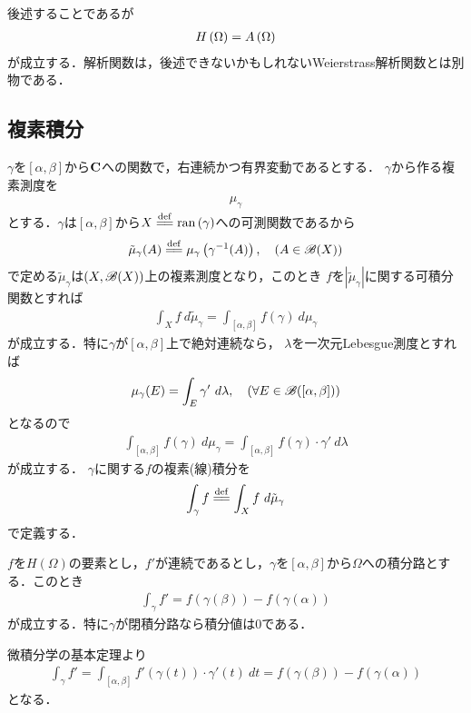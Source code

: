 	後述することであるが
	\begin{align}
		H\left(\Omega\right) = A\left(\Omega\right)
	\end{align}
	が成立する．解析関数は，後述できないかもしれないWeierstrass解析関数とは別物である．
	
\subsection{複素積分}
	$\gamma$を$[\alpha,\beta]$から$\mathbf{C}$への関数で，右連続かつ有界変動であるとする．
	$\gamma$から作る複素測度を
	\begin{align}
		\mu_\gamma
	\end{align}
	とする．$\gamma$は$[\alpha,\beta]$から$X \defeq \ran{\gamma}$への可測関数であるから
	\begin{align}
		\tilde{\mu}_\gamma(A) \defeq \mu_\gamma\left( \gamma^{-1}(A) \right),
		\quad (A \in \borel{X})
	\end{align}
	で定める$\tilde{\mu}_\gamma$は$(X,\mathscr{B}(X))$上の複素測度となり，このとき
	$f$を$|\tilde{\mu}_\gamma|$に関する可積分関数とすれば
	\begin{align}
		\int_X f\ d\tilde{\mu}_\gamma = \int_{[\alpha,\beta]} f(\gamma)\ d\mu_\gamma
	\end{align}
	が成立する．特に$\gamma$が$[\alpha,\beta]$上で絶対連続なら，
	$\lambda$を一次元Lebesgue測度とすれば
	\begin{align}
		\mu_\gamma(E) = \int_E \gamma'\ d\lambda,
		\quad (\forall E \in \mathscr{B}([\alpha,\beta]))
	\end{align}
	となるので
	\begin{align}
		\int_{[\alpha,\beta]} f(\gamma)\ d\mu_\gamma = \int_{[\alpha,\beta]} f(\gamma) \cdot \gamma'\ d\lambda
	\end{align}
	が成立する．
	$\gamma$に関する$f$の複素(線)積分を
	\begin{align}
		\int_\gamma f \defeq \int_X f\ d\tilde{\mu}_\gamma
	\end{align}
	で定義する．
	
	\begin{screen}
		\begin{thm}[正則関数に対する微積分学の基本定理]
			$f$を$H(\Omega)$の要素とし，$f'$が連続であるとし，$\gamma$を$[\alpha,\beta]$から$\Omega$への積分路とする．このとき
			\begin{align}
				\int_{\gamma} f' = f(\gamma(\beta)) - f(\gamma(\alpha))
			\end{align}
			が成立する．特に$\gamma$が閉積分路なら積分値は$0$である．
		\end{thm}
	\end{screen}
	
	\begin{prf}
		微積分学の基本定理より
		\begin{align}
			\int_{\gamma} f'
			= \int_{[\alpha,\beta]} f'(\gamma(t)) \cdot \gamma'(t)\ dt
			= f(\gamma(\beta)) - f(\gamma(\alpha))
		\end{align}
		となる．
		\QED
	\end{prf}